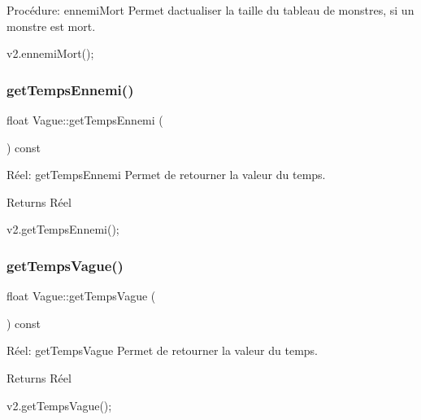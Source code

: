 Procédure\+: ennemi\+Mort Permet d\textquotesingle{}actualiser la taille du tableau de monstres, si un monstre est mort. 


\begin{DoxyCode}
v2.ennemiMort();
\end{DoxyCode}
 \mbox{\label{classVague_a71f47253f6f4db49d994338a8088985c}} 
\subsubsection{\texorpdfstring{get\+Temps\+Ennemi()}{getTempsEnnemi()}}
{\footnotesize\ttfamily float Vague\+::get\+Temps\+Ennemi (\begin{DoxyParamCaption}{ }\end{DoxyParamCaption}) const}



Réel\+: get\+Temps\+Ennemi Permet de retourner la valeur du temps. 

\begin{DoxyReturn}{Returns}
Réel 
\begin{DoxyCode}
v2.getTempsEnnemi();
\end{DoxyCode}
 
\end{DoxyReturn}
\mbox{\label{classVague_af665b6b2ec76931ebb9d5423446cfee8}} 
\subsubsection{\texorpdfstring{get\+Temps\+Vague()}{getTempsVague()}}
{\footnotesize\ttfamily float Vague\+::get\+Temps\+Vague (\begin{DoxyParamCaption}{ }\end{DoxyParamCaption}) const}



Réel\+: get\+Temps\+Vague Permet de retourner la valeur du temps. 

\begin{DoxyReturn}{Returns}
Réel 
\begin{DoxyCode}
v2.getTempsVague();
\end{DoxyCode}
 
\end{DoxyReturn}
\mbox{\label{classVague_a9a23bacd87181f297f522152adb51c36}} 
